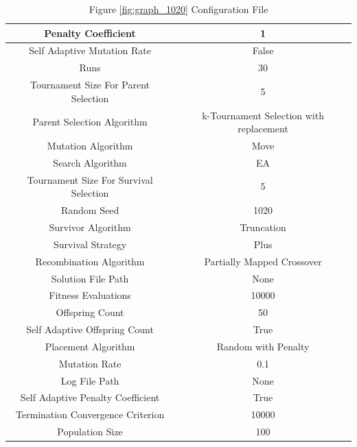 \documentclass{standalone}
\begin{document}
\begin{table}[!htb]
	\centering
	\caption{Figure \ref{fig:graph_1020} Configuration File}
	\label{tab:graph_1020}
	\begin{tabular}{| c | c |}
		\hline
		Penalty Coefficient		& 1		 \\
		\hline
		Self Adaptive Mutation Rate		& False		 \\
		\hline
		Runs		& 30		 \\
		\hline
		Tournament Size For Parent Selection		& 5		 \\
		\hline
		Parent Selection Algorithm		& k-Tournament Selection with replacement		 \\
		\hline
		Mutation Algorithm		& Move		 \\
		\hline
		Search Algorithm		& EA		 \\
		\hline
		Tournament Size For Survival Selection		& 5		 \\
		\hline
		Random Seed		& 1020		 \\
		\hline
		Survivor Algorithm		& Truncation		 \\
		\hline
		Survival Strategy		& Plus		 \\
		\hline
		Recombination Algorithm		& Partially Mapped Crossover		 \\
		\hline
		Solution File Path		& None		 \\
		\hline
		Fitness Evaluations		& 10000		 \\
		\hline
		Offspring Count		& 50		 \\
		\hline
		Self Adaptive Offspring Count		& True		 \\
		\hline
		Placement Algorithm		& Random with Penalty		 \\
		\hline
		Mutation Rate		& 0.1		 \\
		\hline
		Log File Path		& None		 \\
		\hline
		Self Adaptive Penalty Coefficient		& True		 \\
		\hline
		Termination Convergence Criterion		& 10000		 \\
		\hline
		Population Size		& 100		 \\
		\hline
	\end{tabular}
\end{table}
\end{document}
